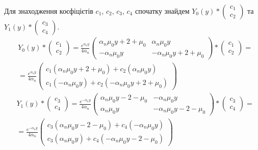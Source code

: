 Для знаходження коєфіцієтів $c_1$, $c_2$, $c_3$, $c_4$ спочатку
знайдем $Y_0(y) * \begin{pmatrix}c_1 \\ c_2\end{pmatrix}$ та $Y_1(y) * \begin{pmatrix}c_3 \\ c_4\end{pmatrix}$.
\begin{align*}
    &Y_0(y) * \begin{pmatrix}c_1 \\ c_2\end{pmatrix} = \frac{e^{\alpha_n y}}{4\alpha_n} \begin{pmatrix}
        \alpha_n \mu_0 y + 2 + \mu_0 & \alpha_n \mu_0 y \\
        -\alpha_n \mu_0 y & -\alpha_n \mu_0 y + 2 + \mu_0
        \end{pmatrix} * \begin{pmatrix}c_1 \\ c_2\end{pmatrix} = \\
    &=\frac{e^{\alpha_n y}}{4\alpha_n} \begin{pmatrix}
        c_1(\alpha_n \mu_0 y + 2 + \mu_0) + c_2(\alpha_n \mu_0 y) \\
        c_1(-\alpha_n \mu_0 y) + c_2(-\alpha_n \mu_0 y + 2 + \mu_0)
        \end{pmatrix}
\end{align*}
\begin{align*}
    &Y_1(y) * \begin{pmatrix}c_3 \\ c_4\end{pmatrix} = \frac{e^{-\alpha_n y}}{4\alpha_n} \begin{pmatrix}
        \alpha_n \mu_0 y - 2 - \mu_0 & -\alpha_n \mu_0 y \\
        \alpha_n \mu_0 y & -\alpha_n \mu_0 y - 2 - \mu_0
        \end{pmatrix} * \begin{pmatrix}c_3 \\ c_4\end{pmatrix} = \\
    &=\frac{e^{-\alpha_n y}}{4\alpha_n} \begin{pmatrix}
        c_3(\alpha_n \mu_0 y - 2 - \mu_0) + c_4(-\alpha_n \mu_0 y) \\
        c_3(\alpha_n \mu_0 y) + c_4(-\alpha_n \mu_0 y - 2 - \mu_0)
        \end{pmatrix}
\end{align*}
